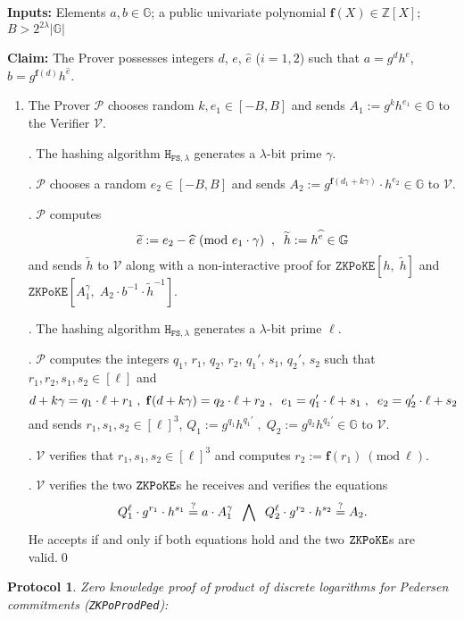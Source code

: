 \documentclass[11pt, lettersize, notitlepage, leqno, footskip=0.6cm]{article}
\newcommand{\bz}{\mathbb Z}
\newcommand{\ttt}{\texttt}
\newcommand{\bG}{\mathbb{G}}
\newcommand{\wti}{\widetilde}
\newcommand{\mc}{\mathcal}
\newcommand{\mb}{\mathbb}
\newcommand{\mbf}{\mathbf}
\newcommand{\lam}{\lambda}
\newcommand{\what}{\widehat}
\newcommand{\mP}{\mc{P}}
\newcommand{\V}{\mc{V}}
\newcommand{\vs}{\vspace{-0.15cm}}
\newcommand{\noin}{\noindent}
\newcommand{\sta}{\stackrel{?}{=}}
\newcommand{\Mod}[1]{\ (\mathrm{mod}\ #1)}
\newtheorem{Prot}[Thm]{Protocol}
\numberwithin{equation}{section}
\begin{document}
\noin \textbf{Inputs:} Elements $a,b \in \mb{G}$; a public univariate polynomial $\mbf{f}(X)\in \bz[X]$; $B > 2^{2\lam}|\bG|$

\noin \textbf{Claim:} The Prover possesses integers $d$, $e$, $\what{e}$ ($i=1,2$) such that $a = g^dh^e$, $b = g^{\mbf{f}(d)}h^{\what{e}}$.

\begin{enumerate}[wide, labelwidth=!, labelindent=0pt]\vs \item The Prover $\mP$ chooses random $k, e_1\in[-B,B]$ and sends $A_1:= g^{k}h^{e_1}\in \bG$ to the Verifier $\V$.

\noin 2. The hashing algorithm $\ttt{H}_{\ttt{FS},\lam}$ generates a $\lam$-bit prime $\gamma$.

\noin 3. $\mP$ chooses a random $e_2 \in [-B,B]$ and sends $A_2:= g^{\mbf{f}(d_1+k\gamma)}\cdot h^{e_2}\in \bG$ to $\V$.

\noin 4. $\mP$ computes \vs $$\wti{e}:= e_2-\what{e}\Mod{e_1\cdot \gamma}\;\;,\;\;\wti{h}:= h^{\what{e}}\in \bG\vs $$ and sends $\wti{h}$ to $\V$ along with a non-interactive proof for $\ttt{ZKPoKE}[h,\; \wti{h}]$ and $\ttt{ZKPoKE}[A_1^{\gamma},\;A_2\cdot b^{-1}\cdot \wti{h}^{-1}] $.

\noin 5. The hashing algorithm $\ttt{H}_{\ttt{FS},\lam}$ generates a $\lam$-bit prime $\ell$. 

\noin 6. $\mP$ computes the integers $q_1$, $r_1$, $q_2$, $r_2$, $q_1'$, $s_1$, $q_2'$, $s_2$ such that $r_1,r_2,s_1,s_2\in [\ell]$ and \vs $$d+k\gamma = q_1\cdot \ell + r_1\;,\; \mbf{f}(d+k\gamma) = q_2\cdot \ell + r_2 \;,\;\;e_1 = q_1'\cdot \ell+s_1 \;,\;\;e_2 = q_2'\cdot \ell+s_2 \vs $$ and sends $r_1 ,s_1, s_2\in [\ell]^3$, $Q_1:= g^{q_1}h^{q_1'}\;,\; Q_2:= g^{q_2}h^{q_2'}\in \bG$ to $\V$.

\noin 7. $\V$ verifies that $r_1 ,s_1, s_2\in [\ell]^3$ and computes $r_2:= \mbf{f}(r_1)\Mod{\ell}$.

\noin 8. $\V$ verifies the two $\tt{ZKPoKE}$s he receives and verifies the equations \vs $$ Q_1^{\ell}\cdot g^{r_1}\cdot h^{s_1}\sta a\cdot A_1^{\gamma} \;\;\bigwedge\;\; Q_2^{\ell}\cdot g^{r_2}\cdot h^{s_2}\sta    A_2 .\vs $$ He accepts if and only if both equations hold and the two $\tt{ZKPoKE}$s are valid.\qed\end{enumerate}







\begin{Prot} \normalfont \hypertarget{PoProdPed}{\textit{Zero knowledge proof of product of discrete logarithms for Pedersen commitments}} (\verb|ZKPoProdPed|):\end{Prot} \vspace{-0.3cm}
\end{document}
